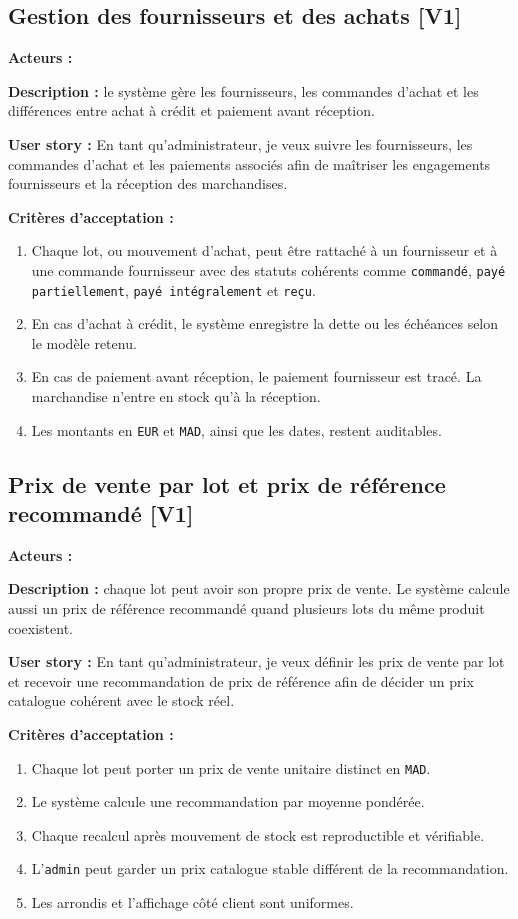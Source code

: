 \documentclass[11pt,a4paper]{scrreprt}
\newcommand{\code}[1]{\texttt{#1}}
\newcommand{\phase}[1]{\textbf{\textcolor{SplinAmber}{#1}}}
\newcommand{\actorbadge}[1]{\highlight{\code{#1}}}
\begin{document}
\subsection{Gestion des fournisseurs et des achats \phase{[V1]}}
\textbf{Acteurs :} \actorbadge{ADMIN}

\textbf{Description :} le système gère les fournisseurs, les commandes d'achat et les différences entre achat à crédit et paiement avant réception.

\textbf{User story :} En tant qu'administrateur, je veux suivre les fournisseurs, les commandes d'achat et les paiements associés afin de maîtriser les engagements fournisseurs et la réception des marchandises.

\textbf{Critères d'acceptation :}
\begin{enumerate}
  \item Chaque lot, ou mouvement d'achat, peut être rattaché à un fournisseur et à une commande fournisseur avec des statuts cohérents comme \code{commandé}, \code{payé partiellement}, \code{payé intégralement} et \code{reçu}.
  \item En cas d'achat à crédit, le système enregistre la dette ou les échéances selon le modèle retenu.
  \item En cas de paiement avant réception, le paiement fournisseur est tracé. La marchandise n'entre en stock qu'à la réception.
  \item Les montants en \code{EUR} et \code{MAD}, ainsi que les dates, restent auditables.
\end{enumerate}

\subsection{Prix de vente par lot et prix de référence recommandé \phase{[V1]}}
\textbf{Acteurs :} \actorbadge{ADMIN} \actorbadge{SYSTEM}

\textbf{Description :} chaque lot peut avoir son propre prix de vente. Le système calcule aussi un prix de référence recommandé quand plusieurs lots du même produit coexistent.

\textbf{User story :} En tant qu'administrateur, je veux définir les prix de vente par lot et recevoir une recommandation de prix de référence afin de décider un prix catalogue cohérent avec le stock réel.

\textbf{Critères d'acceptation :}
\begin{enumerate}
  \item Chaque lot peut porter un prix de vente unitaire distinct en \code{MAD}.
  \item Le système calcule une recommandation par moyenne pondérée.
  \item Chaque recalcul après mouvement de stock est reproductible et vérifiable.
  \item L'\code{admin} peut garder un prix catalogue stable différent de la recommandation.
  \item Les arrondis et l'affichage côté client sont uniformes.
\end{enumerate}
\end{document}

